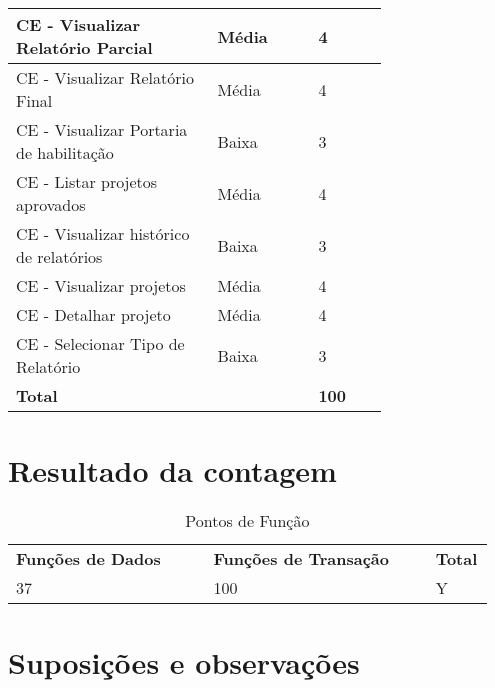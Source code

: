 \begin{table*}[!h]
\begin{tabular}{|p{0.40\linewidth}|p{0.20\linewidth}|p{0.14\linewidth}|}
	  CE - Visualizar Relatório Parcial & Média& 4\\ \hline
	  CE - Visualizar Relatório Final & Média&4 \\ \hline
	  CE - Visualizar Portaria de habilitação &Baixa & 3\\ \hline
	  CE - Listar projetos aprovados & Média& 4\\ \hline
	  CE - Visualizar histórico de relatórios & Baixa& 3\\ \hline
	  CE - Visualizar projetos & Média& 4\\ \hline
	  CE - Detalhar projeto & Média& 4\\ \hline
	  CE - Selecionar Tipo de Relatório &Baixa & 3\\ \hline
	  \multicolumn{2}{|l|}{\textbf{Total}} & \textbf{100} \\
	\hline
	\end{tabular}
	\end{table*}

\vfill
\pagebreak
\section{Resultado da contagem}

\begin{table*}[!h]
\centering
\caption{Pontos de Função}
\label{resultado_contagem}
  \begin{tabular}{|p{0.40\linewidth}|p{0.45\linewidth}|p{0.10\linewidth}|}
  \hline
  \textbf{Funções de Dados} & \textbf{Funções de Transação} & \textbf{Total} \\ 
  37 & 100 & Y\\
  \hline
 
  \end{tabular}
\end{table*}

\section{Suposições e observações}

